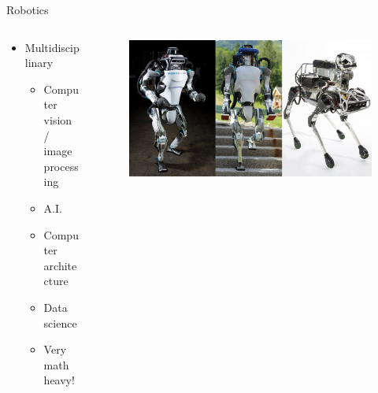 \documentclass{beamer}
\begin{document}
\begin{frame}{Robotics}
\begin{columns}
	\begin{column}{.45\textwidth}
		\begin{itemize}
			\item Multidisciplinary
			\begin{itemize}
				\item Computer vision / image processing
				\item A.I. 
				\item Computer architecture
				\item Data science
				\item Very math heavy!
			\end{itemize}
		\end{itemize}
	\end{column}
	\begin{column}{.55\textwidth}
		\begin{figure}
			\includegraphics[width=\linewidth]{img/robot.jpg}
		\end{figure}
	\end{column}
\end{columns}
\end{frame}
%
\end{document}
